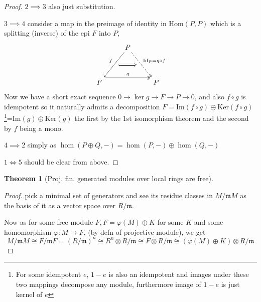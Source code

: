 \documentclass[12pt]{article}
\numberwithin{equation}{section}
\newcommand{\Hom}{{\mathrm{Hom}}}
\newcommand{\image}{{\mathrm{Im}}}
\newcommand{\kernel}{{\mathrm{Ker}}}
\newtheorem{theorem}{Theorem}[section]
\begin{document}
\begin{appendices}
\begin{proof}
		$2 \implies 3$ also just substitution.
		
		$3 \implies 4$ consider a map in the preimage of identity in $\Hom(P,P)$ which is a splitting (inverse) of the epi $F$ into $P$,
		\[\begin{tikzcd}
			& P \\
			\\
			F && P
			\arrow["g", shift left=3, two heads, from=3-1, to=3-3]
			\arrow[""{name=0, anchor=center, inner sep=0}, "f"', from=1-2, to=3-1]
			\arrow[""{name=1, anchor=center, inner sep=0}, "{\mathrm{Id}_P=g \circ f}", dashed, two heads, from=1-2, to=3-3]
			\arrow[shorten <=6pt, shorten >=6pt, Rightarrow, from=0, to=1]
		\end{tikzcd}\]
		Now we have a short exact sequence $0 \to \ker g \to F \to P \to 0$, and also $f\circ g $ is idempotent so it naturally admits a decomposition $F = \image(f \circ g) \oplus \kernel (f \circ g)$\footnote{For some idempotent $e$, $1-e$ is also an idempotent and images under these two mappings decompose any module, furthermore image of $1-e$ is just kernel of $e$}=$\image (g) \oplus \kernel (g)$ the first by the 1st isomorphism theorem and the second by $f $ being a mono.
		
		$4 \implies 2$ simply as $\hom (P \oplus Q,-) = \hom(P,-) \oplus \hom(Q,-)$
		
		$1 \iff 5$ should be clear from above.
		
	\end{proof}
	
	\begin{theorem}[Proj. fin. generated modules over local rings are free]
	\end{theorem}
	\begin{proof}
		pick a minimal set of generators and see its residue classes in $M/\mathfrak{m}M$ as the basis of it as a vector space over $R/\mathfrak{m}$.
		
		Now as for some free module $F, F=\varphi(M)\oplus K$ for some $K$ and some homomorphism $\varphi: M \to F$, (by defn of projective module), 	we get \[ M/\mathfrak{m}M \cong 	F/\mathfrak{m}F = (R/\mathfrak{m})^n\cong R^n\otimes R/\mathfrak{m} \cong F \otimes R/\mathfrak{m} \cong (\varphi(M)\oplus K) \otimes R/\mathfrak{m}\]
		

\end{proof}
\end{appendices}
\end{document}
